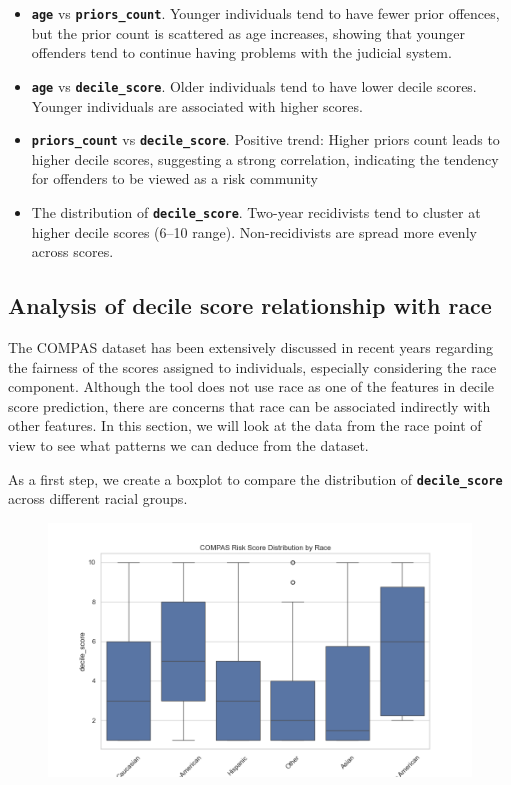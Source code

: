 \documentclass[conference]{IEEEtran}
\begin{document}
	
	\begin{itemize}
		\item \textbf{\texttt{age}} vs \textbf{\texttt{priors\_count}}. Younger individuals tend to have fewer prior offences, but the prior count is scattered as age increases, showing that younger offenders tend to continue having problems with the judicial system.
	
		\item \textbf{\texttt{age}} vs \textbf{\texttt{decile\_score}}. Older individuals tend to have lower decile scores. Younger individuals are associated with higher scores.
	
		\item \textbf{\texttt{priors\_count}} vs \textbf{\texttt{decile\_score}}. Positive trend: Higher priors count leads to higher decile scores, suggesting a strong correlation, indicating the tendency for offenders to be viewed as a risk community    
	
		\item The distribution of \textbf{\texttt{decile\_score}}. Two-year recidivists tend to cluster at higher decile scores (6–10 range). Non-recidivists are spread more evenly across scores.        
	\end{itemize}
	
	
	
	\subsection{Analysis of decile score relationship with race}
	
	The COMPAS dataset has been extensively discussed in recent years regarding the fairness of the scores assigned to individuals, especially considering the race component. Although the tool does not use race as one of the features in decile score prediction, there are concerns that race can be associated indirectly with other features. In this section, we will look at the data from the race point of view to see what patterns we can deduce from the dataset.
	
	As a first step, we create a boxplot to compare the distribution of \textbf{\texttt{decile\_score}} across different racial groups. 
	
	\begin{figure}
		\centering
		\includegraphics[width=0.7\linewidth]{img/decile_score_by_race_boxplot}
		\caption{}
		\label{fig:decilescorebyraceboxplot}
	\end{figure}
	
\end{document}
